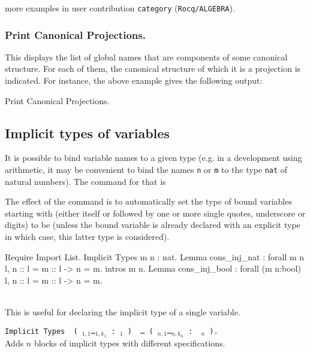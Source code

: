 \SeeAlso more examples in user contribution \texttt{category}
(\texttt{Rocq/ALGEBRA}).

\subsubsection{Print Canonical Projections.
}

This displays the list of global names that are components of some
canonical structure. For each of them, the canonical structure of
which it is a projection is indicated. For instance, the above example 
gives the following output:

\begin{coq_example}
Print Canonical Projections.
\end{coq_example}

\subsection{Implicit types of variables}

It is possible to bind variable names to a given type (e.g. in a
development using arithmetic, it may be convenient to bind the names
{\tt n} or {\tt m} to the type {\tt nat} of natural numbers). The
command for that is
\begin{quote}
{}
\end{quote}
The effect of the command is to automatically set the type of bound
variables starting with {\ident} (either {\ident} itself or
{\ident} followed by one or more single quotes, underscore or digits)
to be {\type} (unless the bound variable is already declared with an
explicit type in which case, this latter type is considered).

\Example
\begin{coq_example}
Require Import List.
Implicit Types m n : nat.
Lemma cons_inj_nat : forall m n l, n :: l = m :: l -> n = m.
intros m n.
Lemma cons_inj_bool : forall (m n:bool) l, n :: l = m :: l -> n = m.
\end{coq_example}

\begin{Variants}
\item {}\\
This is useful for declaring the implicit type of a single variable.
\item
 {\tt Implicit Types\,%
(\,{\ident$_{1,1}$}\ldots{\ident$_{1,k_1}$}\,{\tt :}\,{\term$_1$} {\tt )}\,%
\ldots\,{\tt (}\,{\ident$_{n,1}$}\ldots{\ident$_{n,k_n}$}\,{\tt :}\,%
{\term$_n$} {\tt )}.}\\ 
  Adds $n$ blocks of implicit types with different specifications.
\end{Variants}


